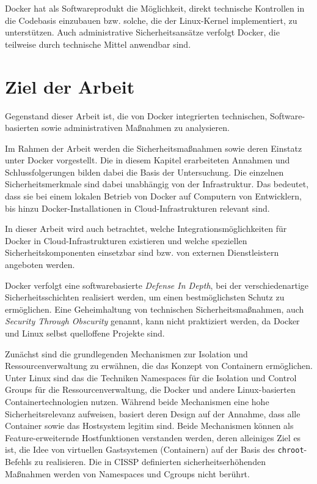 \documentclass[../main.tex]{subfiles}
\begin{document}
    Docker hat als Softwareprodukt die Möglichkeit, direkt technische Kontrollen in die Codebasis einzubauen bzw. solche, die der Linux-Kernel implementiert, zu unterstützen. Auch administrative Sicherheitsansätze verfolgt Docker, die teilweise durch technische Mittel anwendbar sind.

  \section{Ziel der Arbeit}
    Gegenstand dieser Arbeit ist, die von Docker integrierten technischen, Software-basierten sowie administrativen Maßnahmen zu analysieren.

    Im Rahmen der Arbeit werden die Sicherheitsmaßnahmen sowie deren Einstatz unter Docker vorgestellt. Die in diesem Kapitel erarbeiteten Annahmen und Schlussfolgerungen bilden dabei die Basis der Untersuchung. Die einzelnen Sicherheitsmerkmale sind dabei unabhängig von der Infrastruktur. Das bedeutet, dass sie bei einem lokalen Betrieb von Docker auf Computern von Entwicklern, bis hinzu Docker-Installationen in Cloud-Infrastrukturen relevant sind.

    In dieser Arbeit wird auch betrachtet, welche Integrationsmöglichkeiten für Docker in Cloud-Infrastrukturen existieren und welche speziellen Sicherheitskomponenten einsetzbar sind bzw. von externen Dienstleistern angeboten werden.




  Docker verfolgt eine softwarebasierte \emph{Defense In Depth}, bei der verschiedenartige Sicherheitsschichten realisiert werden, um einen bestmöglichsten Schutz zu ermöglichen. Eine Geheimhaltung von technischen Sicherheitsmaßnahmen, auch \emph{Security Through Obscurity} genannt, kann nicht praktiziert werden, da Docker und Linux selbst quelloffene Projekte sind.

  Zunächst sind die grundlegenden Mechanismen zur Isolation und Ressourcenverwaltung zu erwähnen, die das Konzept von Containern ermöglichen. Unter Linux sind das die Techniken Namespaces für die Isolation und Control Groups für die Ressourcenverwaltung, die Docker und andere Linux-basierten Containertechnologien nutzen. Während beide Mechanismen eine hohe Sicherheitsrelevanz aufweisen, basiert deren Design auf der Annahme, dass alle Container sowie das Hostsystem legitim sind. Beide Mechanismen können als Feature-erweiternde Hostfunktionen verstanden werden, deren alleiniges Ziel es ist, die Idee von virtuellen Gastsystemen (Containern) auf der Basis des \texttt{chroot}-Befehls zu realisieren. Die in CISSP definierten sicherheitserhöhenden Maßnahmen werden von Namespaces und Cgroups nicht berührt.
\end{document}
